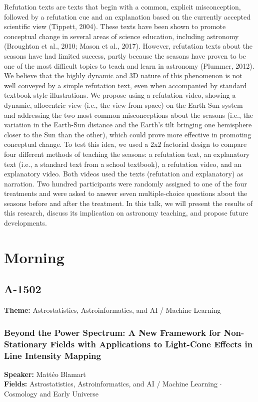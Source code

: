Refutation texts are texts that begin with a common, explicit misconception, followed by a refutation cue and an explanation based on the currently accepted scientific view (Tippett, 2004). These texts have been shown to promote conceptual change in several areas of science education, including astronomy (Broughton et al., 2010; Mason et al., 2017). However, refutation texts about the seasons have had limited success, partly because the seasons have proven to be one of the most difficult topics to teach and learn in astronomy (Plummer, 2012). We believe that the highly dynamic and 3D nature of this phenomenon is not well conveyed by a simple refutation text, even when accompanied by standard textbook-style illustrations. We propose using a refutation video, showing a dynamic, allocentric view (i.e., the view from space) on the Earth-Sun system and addressing the two most common misconceptions about the seasons (i.e., the variation in the Earth-Sun distance and the Earth's tilt bringing one hemisphere closer to the Sun than the other), which could prove more effective in promoting conceptual change. To test this idea, we used a 2x2 factorial design to compare four different methods of teaching the seasons: a refutation text, an explanatory text (i.e., a standard text from a school textbook), a refutation video, and an explanatory video. Both videos used the texts (refutation and explanatory) as narration. Two hundred participants were randomly assigned to one of the four treatments and were asked to answer seven multiple-choice questions about the seasons before and after the treatment. In this talk, we will present the results of this research, discuss its implication on astronomy teaching, and propose future developments.


\section*{Morning}

\subsection*{A-1502}
\textbf{Theme:} Astrostatistics, Astroinformatics, and AI / Machine Learning

\hypertarget{abstract-talk-251}{}\label{abstract-page-talk-251}
\subsubsection*{Beyond the Power Spectrum: A New Framework for Non-Stationary Fields with Applications to Light-Cone Effects in Line Intensity Mapping}
\textbf{Speaker:} Mattéo Blamart\\
\textbf{Fields:} Astrostatistics, Astroinformatics, and AI / Machine Learning $\cdot$ Cosmology and Early Universe

